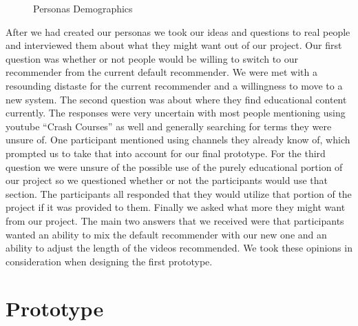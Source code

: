 \documentclass[letterpaper]{article} %
\begin{document}
\begin{figure}
\centering
{}
\caption{Personas Demographics}
\label{fig:Demographics}
\end{figure}


After we had created our personas we took our ideas and questions to real people and interviewed them about what they might want out of our project. Our first question was whether or not people would be willing to switch to our recommender from the current default recommender. We were met with a resounding distaste for the current recommender and a willingness to move to a new system. The second question was about where they find educational content currently. The responses were very uncertain with most people mentioning using youtube “Crash Courses” as well and generally searching for terms they were unsure of. One participant mentioned using channels they already know of, which prompted us to take that into account for our final prototype. For the third question we were unsure of the possible use of the purely educational portion of our project so we questioned whether or not the participants would use that section. The participants all responded that they would utilize that portion of the project if it was provided to them. Finally we asked what more they might want from our project. The main two answers that we received were that participants wanted an ability to mix the default recommender with our new one and an ability to adjust the length of the videos recommended. We took these opinions in consideration when designing the first prototype.

\section{Prototype}
\end{document}
